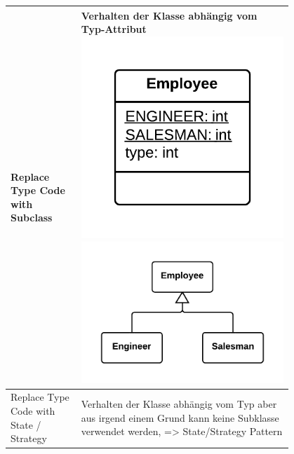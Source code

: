 \documentclass[a4paper, fontsize=6pt]{scrartcl}
\begin{document}
\begin{multicols*}{5}
\begin{tabular}{|p{0.2\linewidth}|p{0.6\linewidth}|}
 Replace Type Code with Subclass & Verhalten der Klasse abhängig vom Typ-Attribut \includegraphics[scale=0.08]{ReplaceTypeCodeWithSubclassesBefore.png} \includegraphics[scale=0.07]{ReplaceTypeCodeWithSubclassesAfter.png} \\ 
 \hline
 Replace Type Code with State / Strategy & Verhalten der Klasse abhängig vom Typ aber aus irgend einem Grund kann keine Subklasse verwendet werden, => State/Strategy Pattern\\

\end{tabular}
\end{multicols*}
\end{document}
